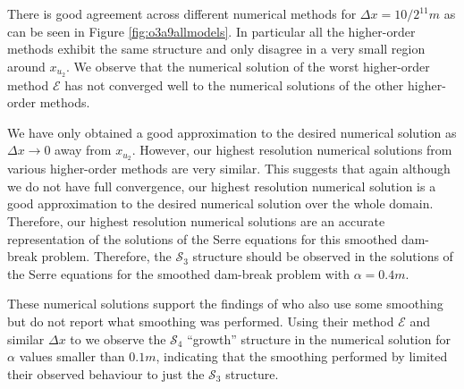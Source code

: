 \documentclass[times]{elsarticle}
\begin{document}
There is good agreement across different numerical methods for $\Delta x = 10/2^{11}m$ as can be seen in Figure \ref{fig:o3a9allmodels}. In particular all the higher-order methods exhibit the same structure and only disagree in a very small region around $x_{u_2}$. We observe that the numerical solution of the worst higher-order method $\mathcal{E}$ has not converged well to the numerical solutions of the other higher-order methods. 

We have only obtained a good approximation to the desired numerical solution as $\Delta x \rightarrow 0$ away from $x_{u_2}$. However, our highest resolution numerical solutions from various higher-order methods are very similar. This suggests that again although we do not have full convergence, our highest resolution numerical solution is a good approximation to the desired numerical solution over the whole domain. Therefore, our highest resolution numerical solutions are an accurate representation of the solutions of the Serre equations for this smoothed dam-break problem. Therefore, the $\mathcal{S}_3$ structure should be observed in the solutions of the Serre equations for the smoothed dam-break problem with $\alpha = 0.4m$.

These numerical solutions support the findings of \citet{El-etal-2006} who also use some smoothing \cite{El-Hoefer-2016-11} but do not report what smoothing was performed. Using their method $\mathcal{E}$ and similar $\Delta x$ to \citet{El-etal-2006} we observe the $\mathcal{S}_4$ ``growth'' structure in the numerical solution for $\alpha$ values smaller than $0.1m$, indicating that the smoothing performed by \citet{El-etal-2006} limited their observed behaviour to just the $\mathcal{S}_3$ structure. 
\end{document}
